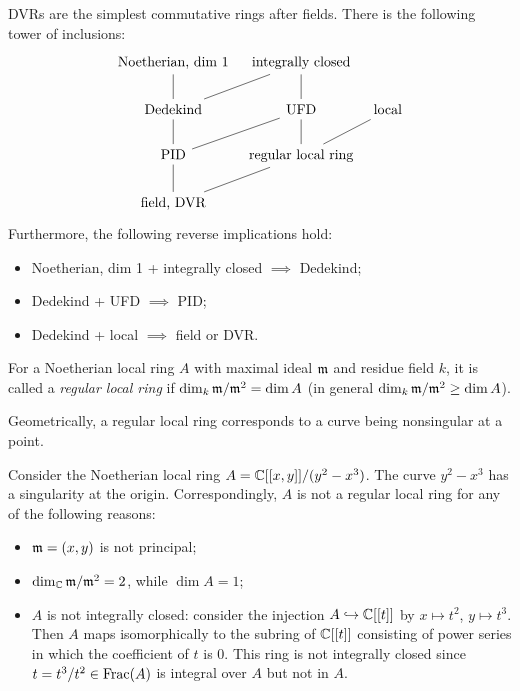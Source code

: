 \documentclass[11pt]{amsart}
\begin{document}
DVRs are the simplest commutative rings after fields. There is the following tower of inclusions:
\[
\begin{tikzcd}[column sep=tiny]
\text{Noetherian, dim 1} \arrow[d, dash] & \text{integrally closed} \arrow[d, dash] & \\
\text{Dedekind} \arrow[d, dash] \arrow[ru, dash] & \text{UFD} \arrow[d, dash] & \text{local} \\
\text{PID} \arrow[d, dash] \arrow[ru, dash] & \text{regular local ring} \arrow[ru, dash] & \\
\text{field, DVR} \arrow[ru, dash] & &
\end{tikzcd}
\]
Furthermore, the following reverse implications hold:
\begin{itemize}
    \item Noetherian, dim 1 + integrally closed $\implies$ Dedekind;
    \item Dedekind + UFD $\implies$ PID;
    \item Dedekind + local $\implies$ field or DVR.
\end{itemize}

\begin{defn}
For a Noetherian local ring $A$ with maximal ideal $\mathfrak{m}$ and residue field $k$, it is called a \emph{regular local ring} if $\dim_k \mathfrak{m}/\mathfrak{m}^2 = \dim A$ (in general $\dim_k \mathfrak{m}/\mathfrak{m}^2 \ge \dim A$).
\end{defn}

Geometrically, a regular local ring corresponds to a curve being nonsingular at a point.

\begin{exm}
Consider the Noetherian local ring $A = \mathbb{C}[[x,y]]/(y^2-x^3)$. The curve $y^2-x^3$ has a singularity at the origin. Correspondingly, $A$ is not a regular local ring for any of the following reasons:
\begin{itemize}
    \item $\mathfrak{m} = (x,y)$ is not principal;
    \item $\dim_{\mathbb{C}} \mathfrak{m}/\mathfrak{m}^2 = 2$, while $\dim A = 1$;
    \item $A$ is not integrally closed: consider the injection $A \hookrightarrow \mathbb{C}[[t]]$ by $x\mapsto t^2$, $y\mapsto t^3$. Then $A$ maps isomorphically to the subring of $\mathbb{C}[[t]]$ consisting of power series in which the coefficient of $t$ is 0. This ring is not integrally closed since $t = t^3/t^2\in \operatorname{Frac}(A)$ is integral over $A$ but not in $A$. 
\end{itemize}
\end{exm}
\end{document}
